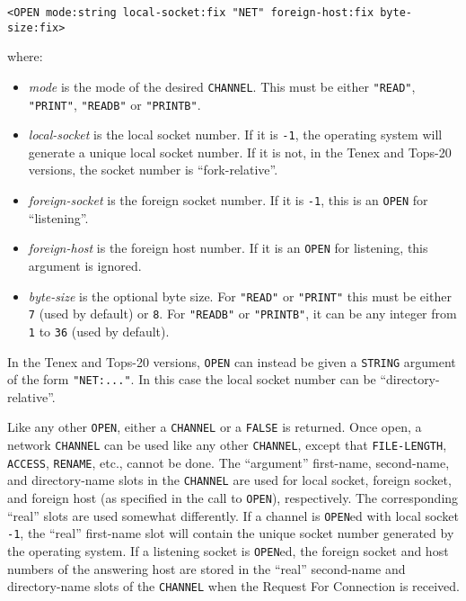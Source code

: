\documentclass[a4paper,]{article}
\providecommand{\tightlist}{%
  \setlength{\itemsep}{0pt}\setlength{\parskip}{0pt}}
\begin{document}
\begin{verbatim}
<OPEN mode:string local-socket:fix "NET" foreign-host:fix byte-size:fix>
\end{verbatim}

where:

\begin{itemize}
\tightlist
\item
  \emph{mode} is the mode of the desired \texttt{CHANNEL}. This must be either \texttt{"READ"}, \texttt{"PRINT"},
  \texttt{"READB"} or \texttt{"PRINTB"}.
\item
  \emph{local-socket} is the local socket number. If it is \texttt{-1}, the operating system will generate a unique local
  socket number. If it is not, in the Tenex  and Tops-20  versions, the
  socket number is ``fork-relative''.
\item
  \emph{foreign-socket} is the foreign socket number. If it is \texttt{-1}, this is an \texttt{OPEN} for ``listening''.
\item
  \emph{foreign-host} is the foreign host number. If it is an \texttt{OPEN} for listening, this argument is ignored.
\item
  \emph{byte-size} is the optional byte size. For \texttt{"READ"} or \texttt{"PRINT"} this must be either \texttt{7} (used
  by default) or \texttt{8}. For \texttt{"READB"} or \texttt{"PRINTB"}, it can be any integer from \texttt{1} to
  \texttt{36} (used by default).
\end{itemize}

In the Tenex and Tops-20 versions, \texttt{OPEN} can instead be given a \texttt{STRING} argument of the form
\texttt{"NET:..."}. In this case the local socket number can be ``directory-relative''.

Like any other \texttt{OPEN}, either a \texttt{CHANNEL} or a \texttt{FALSE} is returned. Once open, a network
\texttt{CHANNEL} can be used like any other \texttt{CHANNEL}, except that \texttt{FILE-LENGTH}, \texttt{ACCESS},
\texttt{RENAME}, etc., cannot be done. The ``argument'' first-name, second-name, and directory-name slots in the
\texttt{CHANNEL} are used for local socket, foreign socket, and foreign host (as specified in the call to \texttt{OPEN}),
respectively. The corresponding ``real'' slots are used somewhat differently. If a channel is \texttt{OPEN}ed with local
socket \texttt{-1}, the ``real'' first-name slot will contain the unique socket number generated by the operating system.
If a listening socket is \texttt{OPEN}ed, the foreign socket and host numbers of the answering host are stored in the
``real'' second-name and directory-name slots of the \texttt{CHANNEL} when the Request For Connection is received.
\end{document}
